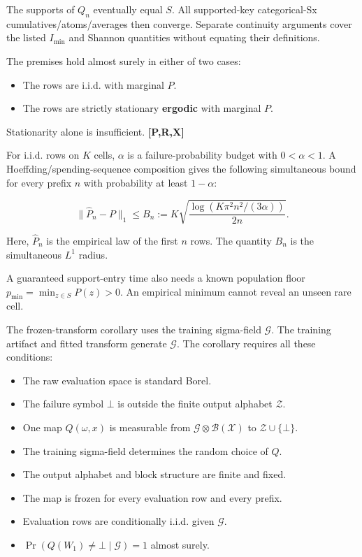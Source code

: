 \documentclass[
  11pt,
  a4paper,
]{article}
\providecommand{\tightlist}{%
  \setlength{\itemsep}{0pt}\setlength{\parskip}{0pt}}
\begin{document}
The supports of \(Q_n\) eventually equal \(S\). All supported-key
categorical-Sx cumulatives/atoms/averages then converge. Separate
continuity arguments cover the listed \(I_{\min}\) and Shannon
quantities without equating their definitions.

The premises hold almost surely in either of two cases:

\begin{itemize}
\tightlist
\item
  The rows are i.i.d. with marginal \(P\).
\item
  The rows are strictly stationary \textbf{ergodic} with marginal \(P\).
\end{itemize}

Stationarity alone is insufficient. \textbf{{[}P,R,X{]}}


For i.i.d. rows on \(K\) cells, \(\alpha\) is a failure-probability
budget with \(0<\alpha<1\). A Hoeffding/spending-sequence composition
gives the following simultaneous bound for every prefix \(n\) with
probability at least \(1-\alpha\):

\[
\lVert\widehat P_n-P\rVert_1
\le B_n:=K\sqrt{\frac{\log(K\pi^2n^2/(3\alpha))}{2n}}.
\]

Here, \(\widehat P_n\) is the empirical law of the first \(n\) rows. The
quantity \(B_n\) is the simultaneous \(L^1\) radius.

A guaranteed support-entry time also needs a known population floor
\(p_{\min}=\min_{z\in S}P(z)>0\). An empirical minimum cannot reveal an
unseen rare cell.

The frozen-transform corollary uses the training sigma-field
\(\mathcal G\). The training artifact and fitted transform generate
\(\mathcal G\). The corollary requires all these conditions:

\begin{itemize}
\tightlist
\item
  The raw evaluation space is standard Borel.
\item
  The failure symbol \(\bot\) is outside the finite output alphabet
  \(\mathcal Z\).
\item
  One map \(Q(\omega,x)\) is measurable from
  \(\mathcal G\otimes\mathcal B(\mathcal X)\) to
  \(\mathcal Z\cup\{\bot\}\).
\item
  The training sigma-field determines the random choice of \(Q\).
\item
  The output alphabet and block structure are finite and fixed.
\item
  The map is frozen for every evaluation row and every prefix.
\item
  Evaluation rows are conditionally i.i.d. given \(\mathcal G\).
\item
  \(\Pr(Q(W_1)\ne\bot\mid\mathcal G)=1\) almost surely.
\end{itemize}
\end{document}
